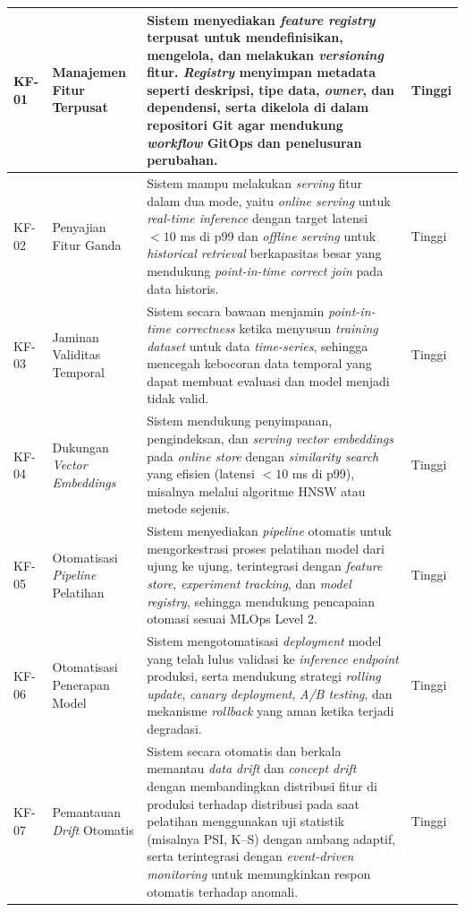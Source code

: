 {\begin{longtable}{|>{\centering\arraybackslash}m{0.75cm}|m{2cm}|m{8cm}|>{\centering\arraybackslash}m{1.75cm}|}
KF-01 & Manajemen Fitur Terpusat & Sistem menyediakan \textit{feature registry} terpusat untuk mendefinisikan, mengelola, dan melakukan \textit{versioning} fitur. \textit{Registry} menyimpan metadata seperti deskripsi, tipe data, \textit{owner}, dan dependensi, serta dikelola di dalam repositori Git agar mendukung \textit{workflow} GitOps dan penelusuran perubahan. & Tinggi \\
\hline
KF-02 & Penyajian Fitur Ganda & Sistem mampu melakukan \textit{serving} fitur dalam dua mode, yaitu \textit{online serving} untuk \textit{real-time inference} dengan target latensi $< 10$ ms di p99 dan \textit{offline serving} untuk \textit{historical retrieval} berkapasitas besar yang mendukung \textit{point-in-time correct join} pada data historis. & Tinggi \\
\hline
KF-03 & Jaminan Validitas Temporal & Sistem secara bawaan menjamin \textit{point-in-time correctness} ketika menyusun \textit{training dataset} untuk data \textit{time-series}, sehingga mencegah kebocoran data temporal yang dapat membuat evaluasi dan model menjadi tidak valid. & Tinggi \\
\hline
KF-04 & Dukungan \textit{Vector Embeddings} & Sistem mendukung penyimpanan, pengindeksan, dan \textit{serving vector embeddings} pada \textit{online store} dengan \textit{similarity search} yang efisien (latensi $< 10$ ms di p99), misalnya melalui algoritme HNSW atau metode sejenis. & Tinggi \\
\hline
KF-05 & Otomatisasi \textit{Pipeline} Pelatihan & Sistem menyediakan \textit{pipeline} otomatis untuk mengorkestrasi proses pelatihan model dari ujung ke ujung, terintegrasi dengan \textit{feature store}, \textit{experiment tracking}, dan \textit{model registry}, sehingga mendukung pencapaian otomasi sesuai MLOps Level 2. & Tinggi \\
\hline
KF-06 & Otomatisasi Penerapan Model & Sistem mengotomatisasi \textit{deployment} model yang telah lulus validasi ke \textit{inference endpoint} produksi, serta mendukung strategi \textit{rolling update}, \textit{canary deployment}, \textit{A/B testing}, dan mekanisme \textit{rollback} yang aman ketika terjadi degradasi. & Tinggi \\
\hline
KF-07 & Pemantauan \textit{Drift} Otomatis & Sistem secara otomatis dan berkala memantau \textit{data drift} dan \textit{concept drift} dengan membandingkan distribusi fitur di produksi terhadap distribusi pada saat pelatihan menggunakan uji statistik (misalnya PSI, K--S) dengan ambang adaptif, serta terintegrasi dengan \textit{event-driven monitoring} untuk memungkinkan respon otomatis terhadap anomali. & Tinggi \\

\end{longtable}}
